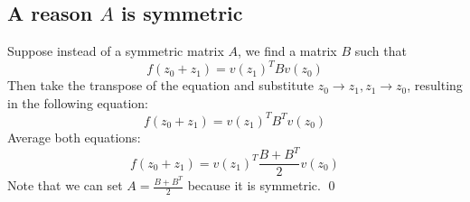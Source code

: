 \documentclass[]{article}
\newcommand{\pqty}[1]{{\left(#1\right)}}
\numberwithin{equation}{section}
\begin{document}
	\subsection{A reason $A$ is symmetric}
	Suppose instead of a symmetric matrix $A$, we find a matrix $B$ such that
	\begin{equation}
		f\pqty{z_0+z_1}=v\pqty{z_1}^T B v\pqty{z_0}
	\end{equation}
	Then take the transpose of the equation and substitute $z_0\to z_1,z_1\to z_0$, resulting in the following equation:
	\begin{equation}
		f\pqty{z_0+z_1}=v\pqty{z_1}^T B^T v\pqty{z_0}
	\end{equation}
	Average both equations:
	\begin{equation}
		f\pqty{z_0+z_1}=v\pqty{z_1}^T \frac{B+B^T}{2} v\pqty{z_0}
	\end{equation}
	Note that we can set $A=\frac{B+B^T}{2}$ because it is symmetric. \qed
\end{document}
